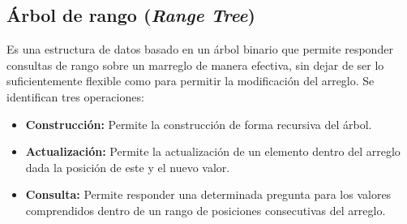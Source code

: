 \subsection{Árbol de rango (\emph{Range Tree})}
Es una estructura de datos basado en un árbol binario que permite responder consultas de rango sobre un marreglo de manera efectiva, sin dejar de ser lo suficientemente flexible como para permitir
la modificación del arreglo. Se identifican tres operaciones:

\begin{itemize}
	\item \textbf{Construcción:} Permite la construcción de forma recursiva del árbol.
	\item \textbf{Actualización:} Permite la actualización de un elemento dentro del arreglo dada la posición de este y el nuevo valor.
	\item \textbf{Consulta:} Permite responder una determinada pregunta para los valores comprendidos dentro de un rango de posiciones consecutivas del arreglo.
\end{itemize}